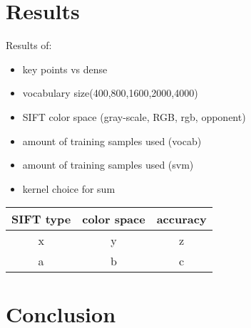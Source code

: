 \documentclass[12pt,a4paper]{article}
\begin{document}
\section{Results}
Results of:\\
\begin{itemize}
\item key points vs dense
\item vocabulary size(400,800,1600,2000,4000)
\item SIFT color space (gray-scale, RGB, rgb, opponent)
\item amount of training samples used (vocab)
\item amount of training samples used (svm)
\item kernel choice for sum
\end{itemize}
\begin{tabular}{|c|c|c|}
\hline
SIFT type & color space & accuracy \\
\hline
x & y & z\\
a & b & c\\
\hline
\end{tabular}
\section{Conclusion}
\end{document}
